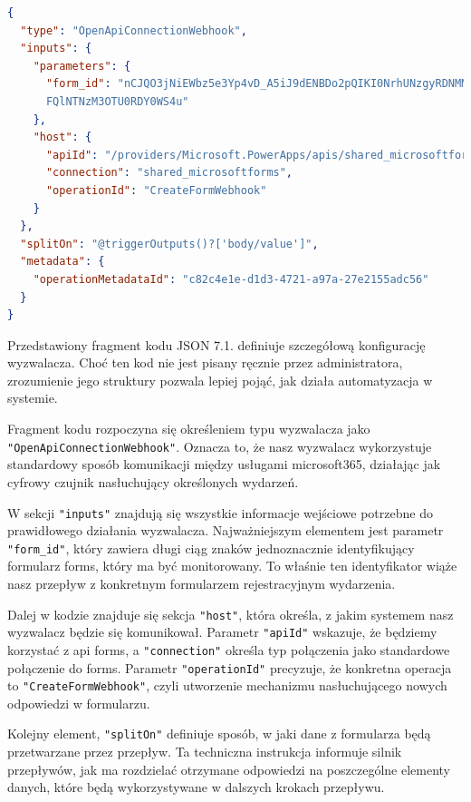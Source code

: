 \begin{lstlisting}[language=JSON, caption=Konfiguracja wyzwalacza Power Automate w języku JSON źródło: kod wygenerowany na podstwie konfiguracji poprzez narzędzie Power Automate]
{
  "type": "OpenApiConnectionWebhook",
  "inputs": {
    "parameters": {
      "form_id": "nCJQO3jNiEWbz5e3Yp4vD_A5iJ9dENBDo2pQIKI0NrhUNzgyRDNMM1JWRTR
      FQlNTNzM3OTU0RDY0WS4u"
    },
    "host": {
      "apiId": "/providers/Microsoft.PowerApps/apis/shared_microsoftforms",
      "connection": "shared_microsoftforms",
      "operationId": "CreateFormWebhook"
    }
  },
  "splitOn": "@triggerOutputs()?['body/value']",
  "metadata": {
    "operationMetadataId": "c82c4e1e-d1d3-4721-a97a-27e2155adc56"
  }
}
\end{lstlisting}

Przedstawiony fragment kodu JSON  7.1. definiuje szczegółową konfigurację wyzwalacza. Choć ten kod nie jest pisany ręcznie przez administratora, zrozumienie jego struktury pozwala lepiej pojąć, jak działa automatyzacja w systemie.

Fragment kodu rozpoczyna się określeniem typu wyzwalacza jako \texttt{"OpenApiConnectionWebhook"}. Oznacza to, że nasz wyzwalacz wykorzystuje standardowy sposób komunikacji między usługami \gls{microsoft365}, działając jak cyfrowy czujnik nasłuchujący określonych wydarzeń.

W sekcji \texttt{"inputs"} znajdują się wszystkie informacje wejściowe potrzebne do prawidłowego działania wyzwalacza. Najważniejszym elementem jest parametr \texttt{"form\_id"}, który zawiera długi ciąg znaków jednoznacznie identyfikujący formularz \gls{forms}, który ma być monitorowany. To właśnie ten identyfikator wiąże nasz przepływ z konkretnym formularzem rejestracyjnym wydarzenia.

Dalej w kodzie znajduje się sekcja \texttt{"host"}, która określa, z jakim systemem nasz wyzwalacz będzie się komunikował. Parametr \texttt{"apiId"} wskazuje, że będziemy korzystać z \gls{api} \gls{forms}, a \texttt{"connection"} określa typ połączenia jako standardowe połączenie do \gls{forms}. Parametr \texttt{"operationId"} precyzuje, że konkretna operacja to \texttt{"CreateFormWebhook"}, czyli utworzenie mechanizmu nasłuchującego nowych odpowiedzi w formularzu.

Kolejny element, \texttt{"splitOn"} definiuje sposób, w jaki dane z formularza będą przetwarzane przez przepływ. Ta techniczna instrukcja informuje silnik przepływów, jak ma rozdzielać otrzymane odpowiedzi na poszczególne elementy danych, które będą wykorzystywane w dalszych krokach przepływu.

